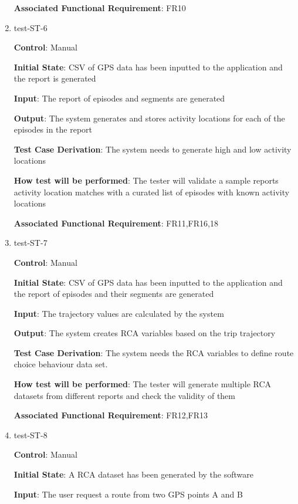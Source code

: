 \documentclass[12pt, titlepage]{article}
\begin{document}
\begin{enumerate}
\textbf{Associated Functional Requirement}: FR10

\item{test-ST-6\\}

\textbf{Control}: Manual
					
\textbf{Initial State}: CSV of GPS data has been inputted to the application and the report is generated
					
\textbf{Input}: The report of episodes and segments are generated
					
\textbf{Output}: The system generates and stores activity locations for each of the episodes in the report

\textbf{Test Case Derivation}: The system needs to generate high and low activity locations

\textbf{How test will be performed}: The tester will validate a sample reports activity location matches with a curated list of episodes with known activity locations

\textbf{Associated Functional Requirement}: FR11,FR16,18

\item{test-ST-7\\}

\textbf{Control}: Manual
					
\textbf{Initial State}: CSV of GPS data has been inputted to the application and the report of episodes and their segments are generated
					
\textbf{Input}: The trajectory values are calculated by the system
					
\textbf{Output}: The system creates RCA variables based on the trip trajectory 

\textbf{Test Case Derivation}: The system needs the RCA variables to define route choice behaviour data set. 

\textbf{How test will be performed}: The tester will generate multiple RCA datasets from different reports and check the validity of them

\textbf{Associated Functional Requirement}: FR12,FR13

\item{test-ST-8\\}

\textbf{Control}: Manual
					
\textbf{Initial State}: A RCA dataset has been generated by the software
					
\textbf{Input}: The user request a route from two GPS points A and B 
					

\end{enumerate}
\end{document}
